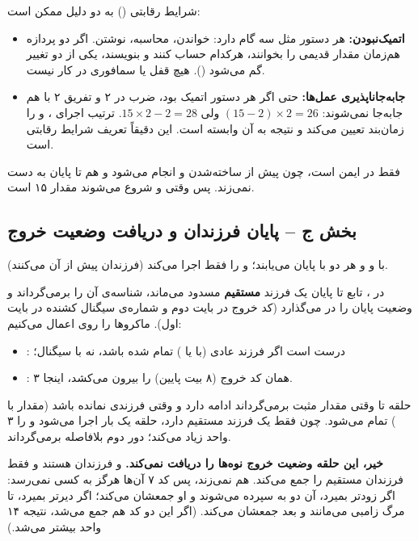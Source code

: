 شرایط رقابتی () به دو دلیل ممکن است:
\begin{itemize}
  \item \textbf{اتمیک‌نبودن:} هر دستور مثل  سه گام دارد: خواندن، محاسبه، نوشتن. اگر دو پردازه هم‌زمان مقدار قدیمی را بخوانند، هرکدام حساب کنند و بنویسند، یکی از دو تغییر گم می‌شود (). هیچ قفل یا سمافوری در کار نیست.
  \item \textbf{جابه‌جاناپذیری عمل‌ها:} حتی اگر هر دستور اتمیک بود، ضرب در ۲ و تفریق ۲ با هم جابه‌جا نمی‌شوند: \mbox{$(15-2)\times 2 = 26$} ولی \mbox{$15\times 2-2 = 28$}. ترتیب اجرای ،  و  را زمان‌بند تعیین می‌کند و نتیجه به آن وابسته است. این دقیقاً تعریف شرایط رقابتی است.
\end{itemize}
فقط  در  ایمن است، چون پیش از ساخته‌شدن  و  انجام می‌شود و  هم تا پایان  به  دست نمی‌زند. پس وقتی  و  شروع می‌شوند مقدار ۱۵ است.

\subsection*{بخش ج – پایان فرزندان و دریافت وضعیت خروج}

 با  و  و  هر دو با  پایان می‌یابند؛  و  را فقط  اجرا می‌کند (فرزندان پیش از آن  می‌کنند).

در ، تابع  تا پایان یک فرزند \textbf{مستقیم} مسدود می‌ماند، شناسه‌ی آن را برمی‌گرداند و وضعیت پایان را در  می‌گذارد (کد خروج در بایت دوم و شماره‌ی سیگنال کشنده در بایت اول). ماکروها را روی  اعمال می‌کنیم:
\begin{itemize}
  \item {}: درست است اگر فرزند عادی (با  یا ) تمام شده باشد، نه با سیگنال؛
  \item {}: همان کد خروج (۸ بیت پایین) را بیرون می‌کشد، اینجا ۳.
\end{itemize}
حلقه تا وقتی  مقدار مثبت برمی‌گرداند ادامه دارد و وقتی فرزندی نمانده باشد (مقدار  با ) تمام می‌شود. چون  فقط یک فرزند مستقیم دارد، حلقه یک بار اجرا می‌شود و  را ۳ واحد زیاد می‌کند؛ دور دوم  بلافاصله  برمی‌گرداند.

\textbf{خیر، این حلقه وضعیت خروج نوه‌ها را دریافت نمی‌کند.}  و  فرزندان  هستند و  فقط فرزندان مستقیم را جمع می‌کند.  هم  نمی‌زند، پس کد ۷ آن‌ها هرگز به کسی نمی‌رسد: اگر  زودتر بمیرد، آن دو به  سپرده می‌شوند و او جمعشان می‌کند؛ اگر دیرتر بمیرد، تا مرگ  زامبی می‌مانند و بعد  جمعشان می‌کند. (اگر این دو کد هم جمع می‌شد، نتیجه ۱۴ واحد بیشتر می‌شد.)

